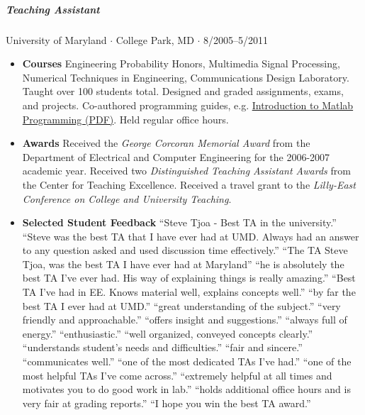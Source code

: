 \documentclass[10pt,letterpaper]{article}
\begin{document}
\subparagraph{Teaching Assistant}
University of Maryland $\cdot$ College Park, MD $\cdot$ 8/2005--5/2011
\begin{itemize}
    \item \textbf{Courses} Engineering Probability Honors, Multimedia Signal Processing, Numerical Techniques in Engineering, Communications Design Laboratory. Taught over 100 students total. Designed and graded assignments, exams, and projects. Co-authored programming guides, e.g. \href{https://stevetjoa.com/static/408_0608_matlab_intro.pdf}{Introduction to Matlab Programming (PDF)}. Held regular office hours. 
    \item \textbf{Awards} Received the \textit{George Corcoran Memorial Award} from the Department of Electrical and Computer Engineering for the 2006-2007 academic year.  Received two \textit{Distinguished Teaching Assistant Awards} from the Center for Teaching Excellence.  Received a travel grant to the \textit{Lilly-East Conference on College and University Teaching}.
    \item \textbf{Selected Student Feedback}  ``Steve Tjoa - Best TA in the university.'' ``Steve was the best TA that I have ever had at UMD. Always had an answer to any question asked and used discussion time effectively.'' ``The TA Steve Tjoa, was the best TA I have ever had at Maryland'' ``he is absolutely the best TA I've ever had. His way of explaining things is really amazing.'' ``Best TA I've had in EE. Knows material well, explains concepts well.'' ``by far the best TA I ever had at UMD.''  ``great understanding of the subject.'' ``very friendly and approachable.'' ``offers insight and suggestions.'' ``always full of energy.''  ``enthusiastic.'' ``well organized, conveyed concepts clearly.'' ``understands student's needs and difficulties.'' ``fair and sincere.'' ``communicates well.'' ``one of the most dedicated TAs I've had.'' ``one of the most helpful TAs I've come across.'' ``extremely helpful at all times and motivates you to do good work in lab.'' ``holds additional office hours and is very fair at grading reports.'' ``I hope you win the best TA award.''
\end{itemize}
\end{document}
